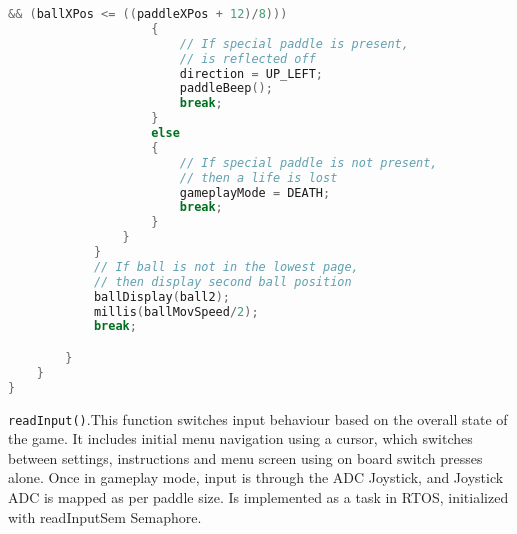 \documentclass{article}
\begin{document}
\begin{lstlisting}[basicstyle = \small, language = C]
                    && (ballXPos <= ((paddleXPos + 12)/8)))
                    {
                        // If special paddle is present, 
                        // is reflected off
                        direction = UP_LEFT;
                        paddleBeep();
                        break;
                    }
                    else
                    {
                        // If special paddle is not present, 
                        // then a life is lost
                        gameplayMode = DEATH;
                        break;
                    }
                }
            }
            // If ball is not in the lowest page, 
            // then display second ball position
            ballDisplay(ball2);
            millis(ballMovSpeed/2);
            break;

        }
    }
}
  \end{lstlisting}
\texttt{readInput()}.This function switches input behaviour based on the overall state of the game. It includes initial menu navigation using a cursor, which switches between settings, instructions and menu screen using on board switch presses alone. Once in gameplay mode, input is through the ADC Joystick, and Joystick ADC is mapped as per paddle size. Is implemented as a task in RTOS, initialized with readInputSem Semaphore.
\end{document}

